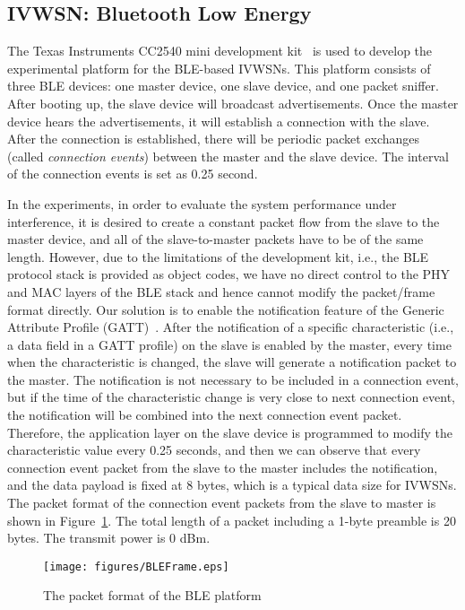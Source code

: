 \documentclass[journal]{IEEEtran}
\begin{document}
\subsection{IVWSN: Bluetooth Low Energy}
The Texas Instruments CC2540 mini development kit~\cite{CC2540kit} is used to develop the experimental platform for the BLE-based IVWSNs. This platform consists of three BLE devices: one master device, one slave device, and one packet sniffer. 
After booting up, the slave device will broadcast advertisements. Once the master device hears the advertisements, it will establish a connection with the slave. After the connection is established, there will be periodic packet exchanges (called \textit{connection events}) between the master and the slave device. The interval of the connection events is set as 0.25 second. 

In the experiments, in order to evaluate the system performance under interference, it is desired to create a constant packet flow from the slave to the master device, and all of the slave-to-master packets have to be of the same length. However, due to the limitations of the development kit, i.e., the BLE protocol stack is provided as object codes, we have no direct control to the PHY and MAC layers of the BLE stack and hence cannot modify the packet/frame format directly. Our solution is to enable the notification feature of the Generic Attribute Profile (GATT)~\cite{BLEspec}. After the notification of a specific characteristic (i.e., a data field in a GATT profile) on the slave is enabled by the master, every time when the characteristic is changed, the slave will generate a notification packet to the master. The notification is not necessary to be included in a connection event, but if the time of the characteristic change is very close to next connection event, the notification will be combined into the next connection event packet. Therefore, the application layer on the slave device is programmed to modify the characteristic value every 0.25 seconds, and then we can observe that every connection event packet from the slave to the master includes the notification, and the data payload is fixed at 8 bytes, which is a typical data size for IVWSNs. The packet format of the connection event packets from the slave to master is shown in Figure~\ref{BLEFrameFormat}. The total length of a packet including a 1-byte preamble is 20 bytes. The transmit power is 0 dBm.





\begin{figure}[tbp]
\centering
\texttt{[image: figures/BLEFrame.eps]}
\caption{The packet format of the BLE platform}
\label{BLEFrameFormat}
\end{figure}
\end{document}
